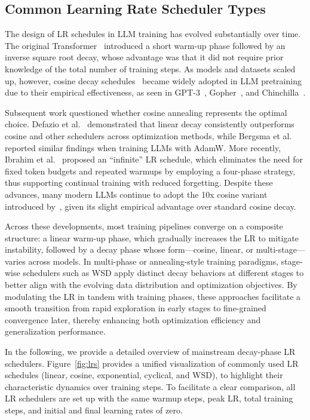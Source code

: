 \subsection{Common Learning Rate Scheduler Types}

{The design of LR schedules in LLM training has evolved substantially over time. The original Transformer~\cite{vaswani2017attention} introduced a short warm-up phase followed by an inverse square root decay, whose advantage was that it did not require prior knowledge of the total number of training steps. As models and datasets scaled up, however, cosine decay schedules~\cite{loshchilov2016sgdr} became widely adopted in LLM pretraining due to their empirical effectiveness, as seen in GPT-3~\cite{brown2020language}, Gopher~\cite{rae2021scaling}, and Chinchilla~\cite{hoffmann2022training}.}

{Subsequent work questioned whether cosine annealing represents the optimal choice. Defazio et al.~\cite{defazio2023optimal} demonstrated that linear decay consistently outperforms cosine and other schedulers across optimization methods, while Bergsma et al.~\cite{bergsma2025straight} reported similar findings when training LLMs with AdamW. More recently, Ibrahim et al.~\cite{ibrahim2024simple} proposed an “infinite” LR schedule, which eliminates the need for fixed token budgets and repeated warmups by employing a four-phase strategy, thus supporting continual training with reduced forgetting. Despite these advances, many modern LLMs continue to adopt the 10x cosine variant introduced by~\cite{kalra2024warmup}, given its slight empirical advantage over standard cosine decay.}

{Across these developments, most training pipelines converge on a composite structure: a linear warm-up phase, which gradually increases the LR to mitigate instability, followed by a decay phase whose form—cosine, linear, or multi-stage—varies across models. In multi-phase or annealing-style training paradigms, stage-wise schedulers such as WSD apply distinct decay behaviors at different stages to better align with the evolving data distribution and optimization objectives. By modulating the LR in tandem with training phases, these approaches facilitate a smooth transition from rapid exploration in early stages to fine-grained convergence later, thereby enhancing both optimization efficiency and generalization performance.}


{In the following, we provide a detailed overview of mainstream decay-phase LR schedulers. Figure~\ref{fig:lrs} provides a unified visualization of commonly used LR schedules (linear, cosine, exponential, cyclical, and WSD), to highlight their characteristic dynamics over training steps. To facilitate a clear comparison, all LR schedulers are set up with the same warmup steps, peak LR, total training steps, and initial and final learning rates of zero.
}

